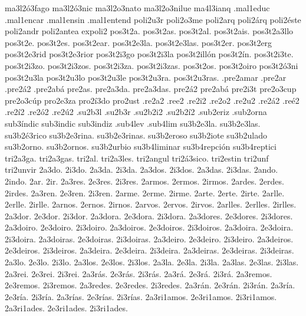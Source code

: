 {ma3l2ó3fago 
ma3l2ó3nic 
ma3l2o3nato 
ma3l2o3nilue 
ma4l3ianq 
%
.mal1educ 
.mal1encar 
.mal1ensin 
.mal1entend 
%
%
poli2u3r 
poli2o3me 
poli2arq 
poli2árq 
poli2éste 
poli2andr 
poli2antea 
expoli2 
%
pos3t2a. 
pos3t2as. 
pos3t2al. 
pos3t2ais. 
pos3t2a3llo 
pos3t2e. 
pos3t2es. 
pos3t2ear. 
pos3t2e3la. 
pos3t2e3las. 
pos3t2er. 
pos3t2erg 
pos3t2e3rid 
pos3t2e3rior 
pos3t2i3go 
pos3t2i3la 
pos3t2illón 
pos3t2ín. 
pos3t2i3te. 
pos3t2i3zo. 
pos3t2i3zos. 
pos3t2i3za. 
pos3t2i3zas. 
pos3t2os. 
pos3t2oiro 
pos3t2ó3ni 
pos3t2u3la 
pos3t2u3lo 
pos3t2u3le 
pos3t2u3ra. 
pos3t2u3ras. 
%
%
.pre2amar 
.pre2ar 
.pre2á2 
.pre2abá 
%
pre2as. 
pre2a3da. 
pre2a3das. 
pre2á2 
pre2abá 
pre2i3t 
pre2o3cup 
pre2o3cúp 
%
%
pro2e3za 
pro2í3do 
pro2ust 
%
.re2a2 .ree2 .re2i2 .re2o2 .re2u2 .re2á2 .reé2 .re2í2 .re2ó2 .re2ú2 
%
.su2b3l .su2b3r 
%
.su2b2i2 
.su2b2í2 
.sub2eriz 
.sub2orna 
%
sub3índic sub3indic sub3indiz 
%
.sub4lev 
.sub4lim 
%
su3b2e3la. 
su3b2e3las. 
su3b2é3rico 
su3b2e3rina. 
su3b2e3rinas. 
su3b2eroso 
su3b2iote 
su3b2ulado 
su3b2orno. 
su3b2ornos. 
su3b2urbio 
%
su3b4liminar 
su3b4repción 
su3b4reptici 
%
%
tri2a3ga. 
tri2a3gas. 
tri2al. 
tri2a3les. 
tri2angul 
tri2á3sico. 
tri2estin 
tri2unf 
tri2unvir 
%
%
2a3do. 2i3do. 
2a3da. 2i3da. 
2a3dos. 2i3dos. 
2a3das. 2i3das. 
2ando. 2indo. 
2ar. 2ir. 
%
2a3res. 2e3res. 2i3res. 
2armos. 2ermos. 2irmos. 
2ardes. 2erdes. 2irdes. 
2a3ren. 2e3ren. 2i3ren. 
%
2arme. 2erme. 2irme. 
2arte. 2erte. 2irte. 
2arlle. 2erlle. 2irlle. 
2arnos. 2ernos. 2irnos. 
2arvos. 2ervos. 2irvos. 
2arlles. 2erlles. 2irlles. 
%
2a3dor. 2e3dor. 2i3dor. 
2a3dora. 2e3dora. 2i3dora. 
2a3dores. 2e3dores. 2i3dores. 
2a3doiro. 2e3doiro. 2i3doiro. 
2a3doiros. 2e3doiros. 2i3doiros. 
2a3doira. 2e3doira. 2i3doira. 
2a3doiras. 2e3doiras. 2i3doiras. 
2a3deiro. 2e3deiro. 2i3deiro. 
2a3deiros. 2e3deiros. 2i3deiros. 
2a3deira. 2e3deira. 2i3deira. 
2a3deiras. 2e3deiras. 2i3deiras. 
2a3lo. 2e3lo. 2i3lo. 
2a3los. 2e3los. 2i3los. 
2a3la. 2e3la. 2i3la. 
2a3las. 2e3las. 2i3las. 
2a3rei. 2e3rei. 2i3rei. 
2a3rás. 2e3rás. 2i3rás. 
2a3rá. 2e3rá. 2i3rá. 
2a3remos. 2e3remos. 2i3remos. 
2a3redes. 2e3redes. 2i3redes. 
2a3rán. 2e3rán. 2i3rán. 
%
2a3ría. 2e3ría. 2i3ría. 
2a3rías. 2e3rías. 2i3rías. 
2a3ri1amos. 2e3ri1amos. 2i3ri1amos. 
2a3ri1ades. 2e3ri1ades. 2i3ri1ades. 
}

